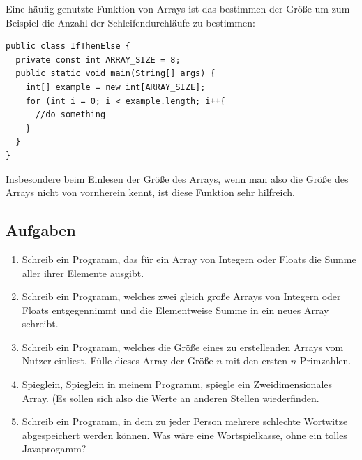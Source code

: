 Eine häufig genutzte Funktion von Arrays ist das bestimmen der Größe um zum Beispiel die Anzahl der Schleifendurchläufe zu bestimmen:

\begin{minipage}{\textwidth}
\begin{lstlisting}
public class IfThenElse {
  private const int ARRAY_SIZE = 8;
  public static void main(String[] args) {
    int[] example = new int[ARRAY_SIZE];
    for (int i = 0; i < example.length; i++{
      //do something
    }
  }
}
\end{lstlisting}	
\end{minipage}

Insbesondere beim Einlesen der Größe des Arrays, wenn man also die Größe des Arrays nicht von vornherein kennt, ist diese Funktion sehr hilfreich.

\subsection{Aufgaben}

\begin{enumerate}
	\item Schreib ein Programm, das für ein Array von Integern oder Floats die Summe aller ihrer Elemente ausgibt.
	\item Schreib ein Programm, welches zwei gleich große Arrays von Integern oder Floats entgegennimmt und die Elementweise Summe in ein neues Array schreibt.
	\item Schreib ein Programm, welches die Größe eines zu erstellenden Arrays vom Nutzer einliest. Fülle dieses Array der Größe $n$ mit den ersten $n$ Primzahlen.
	\item Spieglein, Spieglein in meinem Programm, spiegle ein Zweidimensionales Array. (Es sollen sich also die Werte an anderen Stellen wiederfinden.
	\item Schreib ein Programm, in dem zu jeder Person mehrere schlechte Wortwitze abgespeichert werden können. Was wäre eine Wortspielkasse, ohne ein tolles Javaprogamm?
\end{enumerate}

